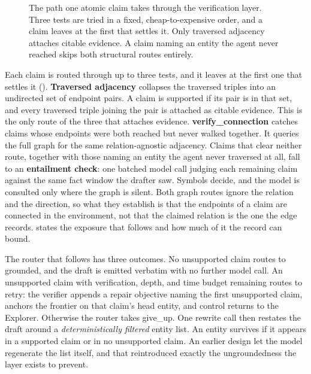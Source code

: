 \begin{figure}[!tbp]
  \begin{center}
    
  \end{center}
  \caption{The path one atomic claim takes through the verification
    layer. Three tests are tried in a fixed, cheap-to-expensive order,
    and a claim leaves at the first that settles it. Only traversed
    adjacency attaches citable evidence. A claim naming an entity the
    agent never reached skips both structural routes entirely.}
  \label{fig:claim-path}
\end{figure}

Each claim is routed through up to three tests, and it leaves at the
first one that settles it (). \textbf{Traversed
adjacency} collapses the traversed triples into an undirected set of
endpoint pairs. A claim is supported if its pair is in that set, and
every traversed triple joining the pair is attached as citable evidence.
This is the only route of the three that attaches evidence.
\textbf{\textsf{verify\_connection}} catches claims whose endpoints were
both reached but never walked together. It queries the full graph for
the same relation-agnostic adjacency. Claims that clear neither route,
together with those naming an entity the agent never traversed at all,
fall to an \textbf{entailment check}: one batched model call judging
each remaining claim against the same fact window the drafter saw.
Symbols decide, and the model is consulted only where the graph is
silent. Both graph routes ignore the relation and the direction, so what
they establish is that the endpoints of a claim are connected in the
environment, not that the claimed relation is the one the edge records.
 states the exposure that follows and how
much of it the record can bound.

The router that follows has three outcomes. No unsupported claim routes
to \textsf{grounded}, and the draft is emitted verbatim with no further
model call. An unsupported claim with verification, depth, and time
budget remaining routes to \textsf{retry}: the verifier appends a repair
objective naming the first unsupported claim, anchors the frontier on
that claim's head entity, and control returns to the Explorer. Otherwise
the router takes \textsf{give\_up}. One rewrite call then restates the
draft around a \emph{deterministically filtered} entity list. An entity
survives if it appears in a supported claim or in no unsupported claim.
An earlier design let the model regenerate the list itself, and that
reintroduced exactly the ungroundedness the layer exists to prevent.

